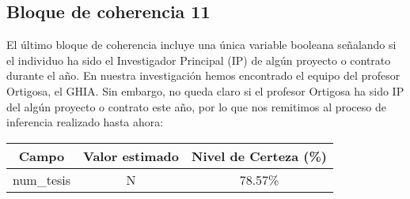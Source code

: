 \documentclass[a4paper]{article}
\begin{document}
\subsection{Bloque de coherencia 11}

El último bloque de coherencia incluye una única variable booleana señalando si el individuo ha sido el Investigador Principal (IP) de algún proyecto o contrato durante el año. En nuestra investigación hemos encontrado el equipo del profesor Ortigosa, el GHIA. Sin embargo, no queda claro si el profesor Ortigosa ha sido IP del algún proyecto o contrato este año, por lo que nos remitimos al proceso de inferencia realizado hasta ahora:

 \begin{table}[H]
 	\centering
 	\begin{tabular}{ccc}
 		\textbf{Campo}                   & \textbf{Valor estimado} & \textbf{Nivel de Certeza (\%)} \\ \hline
 		num\_tesis                       & N                     & 78.57\%                        \\
 	\end{tabular}
 \end{table}
\end{document}
